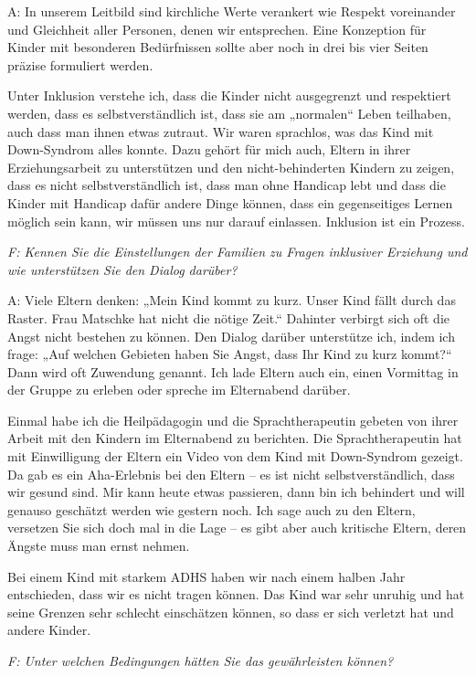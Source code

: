 A: In unserem Leitbild sind kirchliche Werte verankert wie Respekt voreinander und Gleichheit aller Personen, denen wir entsprechen. Eine Konzeption für Kinder mit besonderen Bedürfnissen sollte aber noch in drei bis vier Seiten präzise formuliert werden. 

Unter Inklusion verstehe ich, dass die Kinder nicht ausgegrenzt und respektiert werden, dass es selbstverständlich ist, dass sie am „normalen“ Leben teilhaben, auch dass man ihnen etwas zutraut. Wir waren sprachlos, was das Kind mit Down-Syndrom alles konnte. 
Dazu gehört für mich auch, Eltern in ihrer Erziehungsarbeit zu unterstützen und den nicht-behinderten Kindern zu zeigen, dass es nicht selbstverständlich ist, dass man ohne Handicap lebt und dass die Kinder mit Handicap dafür andere Dinge können, dass ein gegenseitiges Lernen möglich sein kann, wir müssen uns nur darauf einlassen. Inklusion ist ein Prozess. 

\emph{F: Kennen Sie die Einstellungen der Familien zu Fragen inklusiver Erziehung und wie unterstützen Sie den Dialog darüber?}

A: Viele Eltern denken: „Mein Kind kommt zu kurz. Unser Kind fällt durch das Raster. Frau Matschke hat nicht die nötige Zeit.“ Dahinter verbirgt sich oft die Angst nicht bestehen zu können. Den Dialog darüber unterstütze ich, indem ich frage: „Auf welchen Gebieten haben Sie Angst, dass Ihr Kind zu kurz kommt?“ Dann wird oft Zuwendung genannt. Ich lade Eltern auch ein, einen Vormittag in der Gruppe zu erleben oder spreche im Elternabend darüber. 

Einmal habe ich die Heilpädagogin und die Sprachtherapeutin gebeten von ihrer Arbeit mit den Kindern im Elternabend zu berichten. Die Sprachtherapeutin hat mit Einwilligung der Eltern ein Video von dem Kind mit Down-Syndrom gezeigt. Da gab es ein Aha-Erlebnis bei den Eltern -- es ist nicht selbstverständlich, dass wir gesund sind. Mir kann heute etwas passieren, dann bin ich behindert und will genauso geschätzt werden wie gestern noch. Ich sage auch zu den Eltern, versetzen Sie sich doch mal in die Lage -- es gibt aber auch kritische Eltern, deren Ängste muss man ernst nehmen.

Bei einem Kind mit starkem ADHS haben wir nach einem halben Jahr entschieden, dass wir es nicht tragen können. Das Kind war sehr unruhig und hat seine Grenzen sehr schlecht einschätzen können, so dass er sich verletzt hat und andere Kinder. 
	
\emph{F: Unter welchen Bedingungen hätten Sie das gewährleisten können?}

